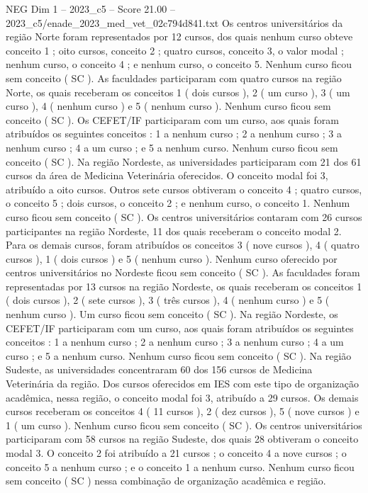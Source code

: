 \begin{textsample}{NEG Dim 1 – 2023\_c5 – Score 21.00 – 2023\_c5/enade\_2023\_med\_vet\_02c794d841.txt}
Os centros universitários da região Norte foram representados por 12 cursos, dos quais nenhum curso obteve conceito 1 ; oito cursos, conceito 2 ; quatro cursos, conceito 3, o valor modal ; nenhum curso, o conceito 4 ; e nenhum curso, o conceito 5.
Nenhum curso ficou sem conceito ( SC ).
As faculdades participaram com quatro cursos na região Norte, os quais receberam os conceitos 1 ( dois cursos ), 2 ( um curso ), 3 ( um curso ), 4 ( nenhum curso ) e 5 ( nenhum curso ).
Nenhum curso ficou sem conceito ( SC ).
Os CEFET/IF participaram com um curso, aos quais foram atribuídos os seguintes conceitos : 1 a nenhum curso ; 2 a nenhum curso ; 3 a nenhum curso ; 4 a um curso ; e 5 a nenhum curso.
Nenhum curso ficou sem conceito ( SC ).
Na região Nordeste, as universidades participaram com 21 dos 61 cursos da área de Medicina Veterinária oferecidos.
O conceito modal foi 3, atribuído a oito cursos.
Outros sete cursos obtiveram o conceito 4 ; quatro cursos, o conceito 5 ; dois cursos, o conceito 2 ; e nenhum curso, o conceito 1.
Nenhum curso ficou sem conceito ( SC ).
Os centros universitários contaram com 26 cursos participantes na região Nordeste, 11 dos quais receberam o conceito modal 2.
Para os demais cursos, foram atribuídos os conceitos 3 ( nove cursos ), 4 ( quatro cursos ), 1 ( dois cursos ) e 5 ( nenhum curso ).
Nenhum curso oferecido por centros universitários no Nordeste ficou sem conceito ( SC ).
As faculdades foram representadas por 13 cursos na região Nordeste, os quais receberam os conceitos 1 ( dois cursos ), 2 ( sete cursos ), 3 ( três cursos ), 4 ( nenhum curso ) e 5 ( nenhum curso ).
Um curso ficou sem conceito ( SC ).
Na região Nordeste, os CEFET/IF participaram com um curso, aos quais foram atribuídos os seguintes conceitos : 1 a nenhum curso ; 2 a nenhum curso ; 3 a nenhum curso ; 4 a um curso ; e 5 a nenhum curso.
Nenhum curso ficou sem conceito ( SC ).
Na região Sudeste, as universidades concentraram 60 dos 156 cursos de Medicina Veterinária da região.
Dos cursos oferecidos em IES com este tipo de organização acadêmica, nessa região, o conceito modal foi 3, atribuído a 29 cursos.
Os demais cursos receberam os conceitos 4 ( 11 cursos ), 2 ( dez cursos ), 5 ( nove cursos ) e 1 ( um curso ).
Nenhum curso ficou sem conceito ( SC ).
Os centros universitários participaram com 58 cursos na região Sudeste, dos quais 28 obtiveram o conceito modal 3.
O conceito 2 foi atribuído a 21 cursos ; o conceito 4 a nove cursos ; o conceito 5 a nenhum curso ; e o conceito 1 a nenhum curso.
Nenhum curso ficou sem conceito ( SC ) nessa combinação de organização acadêmica e região.

\end{textsample}
